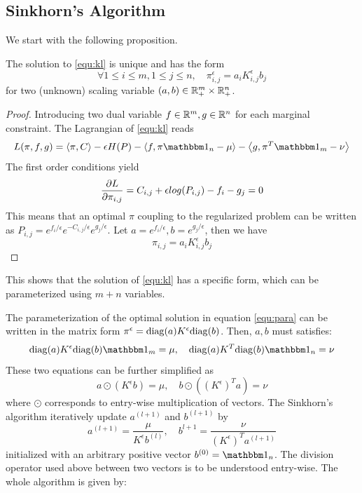 \subsection{Sinkhorn's Algorithm}
We start with the following proposition. 

\begin{proposition}
\label{sh_basic}
The solution to \ref{equ:kl} is unique and has the form 
\begin{equation}
\label{equ:para}
\forall 1\leqslant i\leqslant m, 1\leqslant j\leqslant n, \quad \pi^\epsilon_{i,j}=a_iK^\epsilon_{i,j}b_j
\end{equation}
for two (unknown) scaling variable $(a,b)\in \mathbb{R}_+^m\times\mathbb{R}_+^n$.  
\end{proposition}

\begin{proof}
Introducing two dual variable $f\in\mathbb{R}^m, g\in\mathbb{R}^n$ for each marginal constraint. The Lagrangian of \ref{equ:kl} reads
$$
L(\pi,f,g)=\la\pi,C\ra-\epsilon H(P)-\la f, \pi\mbone_n-\mu\ra-\la g, \pi^T\mbone_m-\nu\ra
$$
The first order conditions yield
$$
\frac{\partial L}{\partial \pi_{i,j}}=C_{i,j}+\epsilon log(P_{i,j})-f_i-g_j=0
$$
This means that an optimal $\pi$ coupling to the regularized problem can be written as $P_{i,j}=e^{f_i/\epsilon}e^{-C_{i,j}/\epsilon}e^{g_j/\epsilon}$. Let $a=e^{f_i/\epsilon}, b= e^{g_j/\epsilon}$, then we have $$
\pi_{i,j}=a_iK^\epsilon_{i,j}b_j
$$
\end{proof}

This shows that the solution of \ref{equ:kl} has a specific form, which can be parameterized using $m+n$ variables.

The parameterization of the optimal solution in equation \ref{equ:para} can be written in the matrix form $\pi^\epsilon = \mathrm{diag}(a)K^\epsilon\mathrm{diag}(b)$. Then, $a,b$ must satisfies:
\begin{equation}
\diag(a)K^\epsilon\diag(b)\mbone_m=\mu, \quad \diag(a)K^T\diag(b)\mbone_n=\nu
\end{equation}
These two equations can be further simplified as
\begin{equation}
a\odot (K^\epsilon b)=\mu, \quad b\odot\left((K^\epsilon)^Ta\right)=\nu
\end{equation}
where $\odot$ corresponds to entry-wise multiplication of vectors. The Sinkhorn's algorithm iteratively update $a^{(l+1)}$ and $b^{(l+1)}$ by
\begin{equation}
\label{upd_sh}
a^{(l+1)}=\frac{\mu}{K^\epsilon b^{(l)}}, \quad b^{l+1}=\frac{\nu}{(K^\epsilon)^Ta^{(l+1)}}
\end{equation}
initialized with an arbitrary positive vector $b^{(0)}=\mbone_n$. The division operator used above between two vectors is to be understood entry-wise. The whole algorithm is given by:

